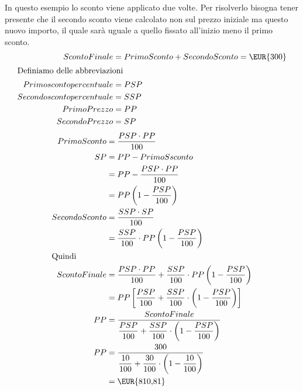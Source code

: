 	In questo esempio lo sconto viene applicato due volte. Per risolverlo bisogna tener presente che il secondo sconto viene calcolato non sul prezzo iniziale ma questo nuovo importo, il quale sarà uguale a quello fissato all'inizio meno il primo sconto.
	\begin{align*}
		ScontoFinale={}&PrimoSconto+SecondoSconto=\mbox{\EUR{300}}\\
		\intertext{Definiamo delle abbreviazioni}
		Primoscontopercentuale={}&PSP\\
		Secondoscontopercentuale={}&SSP\\
		PrimoPrezzo={}&PP\\
		SecondoPrezzo={}&SP\\
	\end{align*}
\begin{align*}
	PrimoSconto={}&\dfrac{PSP\cdot PP}{100}\\
	SP={}&PP-PrimoSsconto\\
	={}&PP-\dfrac{PSP\cdot PP}{100}\\
	={}&PP\left(1-\dfrac{PSP}{100}\right)\\
	SecondoSconto={}&\dfrac{SSP\cdot SP}{100}\\
	={}&\dfrac{SSP}{100}\cdot PP\left(1-\dfrac{PSP}{100}\right)\\
	\intertext{Quindi}
	ScontoFinale={}&\dfrac{PSP\cdot PP}{100}+\dfrac{SSP}{100}\cdot PP\left(1-\dfrac{PSP}{100}\right)\\
	={}&PP\left[\dfrac{PSP}{100}+\dfrac{SSP}{100}\cdot \left(1-\dfrac{PSP}{100}\right)\right]\\
	PP={}&\dfrac{ScontoFinale}{\dfrac{PSP}{100}+\dfrac{SSP}{100}\cdot \left(1-\dfrac{PSP}{100}\right)}\\
	PP={}&\dfrac{300}{\dfrac{10}{100}+\dfrac{30}{100}\cdot \left(1-\dfrac{10}{100}\right)}\\
	={}&\mbox{\EUR{810,81}}\\
\end{align*}
